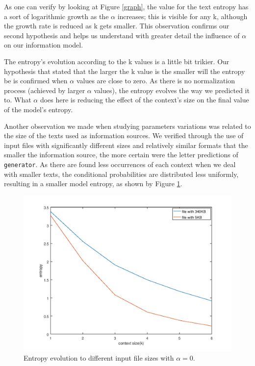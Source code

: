 \documentclass[12pt]{article}
\begin{document}
As one can verify by looking at Figure \ref{graph}, the value for the text
entropy has a sort of logarithmic growth as the $\alpha$ increases; this is 
visible for any k, although the growth rate is reduced as k gets smaller.
This observation confirms our second hypothesis and helps us understand with
greater detail the influence of $\alpha$ on our information model.

The entropy's evolution according to the k values is a little bit trikier.
Our hypothesis that stated that the larger the k value is the smaller will
the entropy be is confirmed when $\alpha$ values are close to zero.
As there is no normalization process (achieved by larger $\alpha$ values),
the entropy evolves the way we predicted it to.
What $\alpha$ does here is reducing the effect of the context's size on the 
final value of the model's entropy.

Another observation we made when studying parameters variations was related
to the size of the texts used as information sources.
We verified through the use of input files with significantly different sizes
and relatively similar formats that the smaller the information source, the
more certain were the letter predictions of \texttt{generator}.
As there are found less occurrences of each context when we deal with smaller
texts, the conditional probabilities are distributed less uniformly, resulting
in a smaller model entropy, as shown by Figure \ref{graph2}.

\begin{figure}[H]
  \centering
  \includegraphics[width=6.5in]{sizeComparison.png}
  \caption{Entropy evolution to different input file sizes with $\alpha=0$.}
  \label{graph2}
\end{figure}
\end{document}

